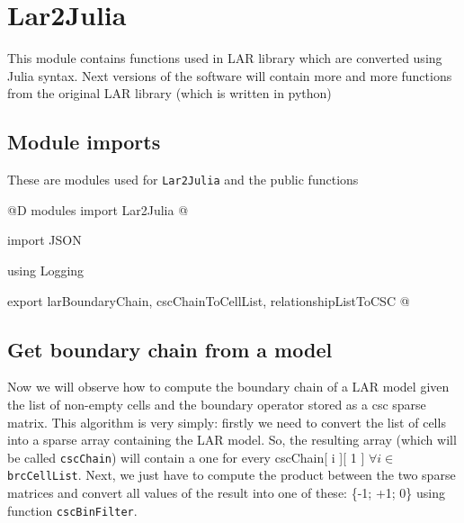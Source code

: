 \documentclass[11pt,oneside]{article}	%
\begin{document}
\section{Lar2Julia}\label{sec:Lar2Julia}
This module contains functions used in LAR library which are converted using Julia syntax. Next versions of the software will contain more and more functions from the original LAR library (which is written in python)

\subsection{Module imports}\label{sec:Lar2JuliaImports}

These are modules used for \texttt{Lar2Julia} and the public functions

@D modules import Lar2Julia
@{import JSON

using Logging

export larBoundaryChain, cscChainToCellList, relationshipListToCSC @}

\subsection{Get boundary chain from a model}\label{sec:boundaryChain}

Now we will observe how to compute the boundary chain of a LAR model given the list of non-empty cells and the boundary operator stored as a csc sparse matrix.
This algorithm is very simply: firstly we need to convert the list of cells into a sparse array containing the LAR model.
So, the resulting array (which will be called \texttt{cscChain}) will contain a one  for every cscChain[ i ][ 1 ] $\forall i \in$ \texttt{brcCellList}. Next, we just have to compute the product between the two sparse matrices and convert all values of the result into one of these: \{-1; +1; 0\} using function \texttt{cscBinFilter}.
\end{document}
